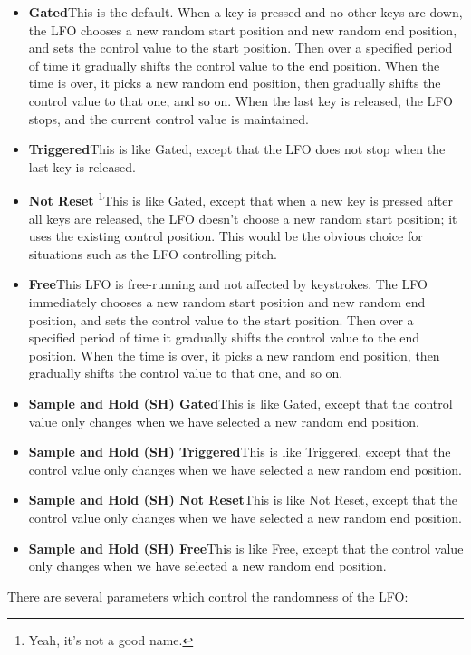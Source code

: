 \documentclass{article}
\begin{document}
\begin{itemize}
\item {\bf Gated}\quad This is the default.  When a key is pressed and no other keys are down, the LFO chooses a new random start position and new random end position, and sets the control value to the start position.  Then over a specified period of time it gradually shifts the control value to the end position.  When the time is over, it picks a new random end position, then gradually shifts the control value to that one, and so on.  When the last key is released, the LFO stops, and the current control value is maintained.
\item {\bf Triggered}\quad This is like Gated, except that the LFO does not stop when the last key is released.
\item {\bf Not Reset} \footnote{Yeah, it's not a good name.}\quad This is like Gated, except that when a new key is pressed after all keys are released, the LFO doesn't choose a new random start position; it uses the existing control position.  This would be the obvious choice for situations such as the LFO controlling pitch.
\item {\bf Free}\quad  This LFO is free-running and not affected by keystrokes.  The LFO immediately chooses a new random start position and new random end position, and sets the control value to the start position.  Then over a specified period of time it gradually shifts the control value to the end position.  When the time is over, it picks a new random end position, then gradually shifts the control value to that one, and so on.
\item {\bf Sample and Hold (SH) Gated}\quad This is like Gated, except that the control value only changes when we have selected a new random end position.
\item {\bf Sample and Hold (SH) Triggered}\quad This is like Triggered, except that the control value only changes when we have selected a new random end position.  
\item {\bf Sample and Hold (SH) Not Reset}\quad This is like Not Reset, except that the control value only changes when we have selected a new random end position.
\item {\bf Sample and Hold (SH) Free}\quad  This is like Free, except that the control value only changes when we have selected a new random end position.
\end{itemize}

There are several parameters which control the randomness of the LFO:
\end{document}
